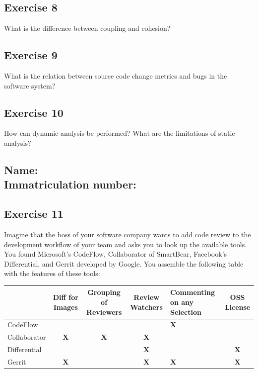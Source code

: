 \documentclass [11pt, a4wide, twoside]{article}
\begin{document}
\subsection*{Exercise 8}
What is the difference between coupling and cohesion?
\vspace{4cm}

\subsection*{Exercise 9}
What is the relation between source code change metrics and bugs in the software system?
\vspace{4cm}

\subsection*{Exercise 10}
How can dynamic analysis be performed? What are the limitations of static analysis?
\vspace{4cm}

\newpage
\subsection*{Name: \\ Immatriculation number:}
\subsection*{Exercise 11}
Imagine that the boss of your software company wants to add code review to the development workflow of your team and asks you to look up the available tools. You found Microsoft's CodeFlow, Collaborator of SmartBear, Facebook's Differential, and Gerrit developed by Google. You assemble the following table with the features of these tools:

\begin{table}[h]
\centering
\begin{tabular}{lCCCFC}
             & Diff for Images & Grouping of Reviewers & Review Watchers & Commenting on any Selection  & OSS License \\ \hline
CodeFlow     & \textbf{}       & \textbf{}             & \textbf{}       & \textbf{X}                   & \textbf{}   \\ \hline
Collaborator & \textbf{X}      & \textbf{X}            & \textbf{X}      & \textbf{}                    & \textbf{}   \\ \hline
Differential & \textbf{}       & \textbf{}             & \textbf{X}      & \textbf{}                    & \textbf{X}  \\ \hline
Gerrit       & \textbf{X}      & \textbf{}             & \textbf{X}      & \textbf{X}                   & \textbf{X}  \\ \hline
\end{tabular}
\end{table}
\end{document}
